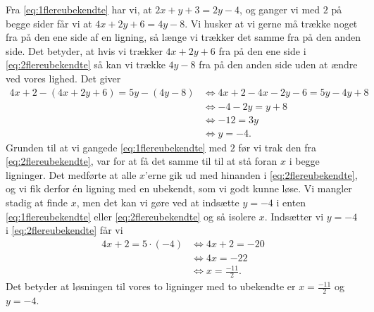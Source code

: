 Fra \eqref{eq:1flereubekendte} har vi, at $2x + y + 3 = 2y-4$, og ganger vi med $2$ på begge sider får vi at $4x+2y+6 = 4y-8$. Vi husker at vi gerne må trække noget fra på den ene side af en ligning, så længe vi trækker det samme fra på den anden side. Det betyder, at hvis vi trækker $4x + 2y +6$ fra på den ene side i \eqref{eq:2flereubekendte} så kan vi trække $4y-8$ fra på den anden side uden at ændre ved vores lighed. Det giver
\begin{align*}
4x+2-(4x+2y+6)= 5y-(4y-8) &\Leftrightarrow 4x+2-4x-2y-6= 5y-4y+8 \\
&\Leftrightarrow -4 -2y = y+8 \\
&\Leftrightarrow -12 = 3y \\
&\Leftrightarrow y=-4.
\end{align*}
Grunden til at vi gangede \eqref{eq:1flereubekendte} med $2$ før vi trak den fra \eqref{eq:2flereubekendte}, var for at få det samme til til at stå foran $x$ i begge ligninger. Det medførte at alle $x$'erne gik ud med hinanden i \eqref{eq:2flereubekendte}, og vi fik derfor én ligning med en ubekendt, som vi godt kunne løse. Vi mangler stadig at finde $x$, men det kan vi gøre ved at indsætte $y=-4$ i enten \eqref{eq:1flereubekendte} eller \eqref{eq:2flereubekendte} og så isolere $x$. Indsætter vi $y=-4$ i \eqref{eq:2flereubekendte} får vi
\begin{align*}
4x + 2 = 5 \cdot (-4) &\Leftrightarrow 4x+2 = -20 \\
&\Leftrightarrow 4x=-22 \\
&\Leftrightarrow x= \frac{-11}{2}.
\end{align*}
Det betyder at løsningen til vores to ligninger med to ubekendte er $x=\frac{-11}{2}$ og $y=-4$.
























